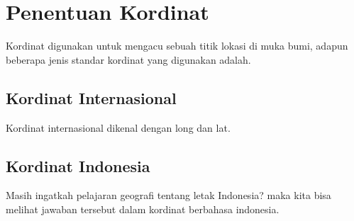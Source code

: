 \section{Penentuan Kordinat}
Kordinat digunakan untuk mengacu sebuah titik lokasi di muka bumi, adapun beberapa jenis standar kordinat yang digunakan adalah.

\subsection{Kordinat Internasional}
Kordinat internasional dikenal dengan long dan lat.


\subsection{Kordinat Indonesia}
Masih ingatkah pelajaran geografi tentang letak Indonesia? maka kita bisa melihat jawaban tersebut dalam kordinat berbahasa indonesia.
